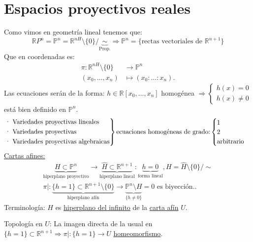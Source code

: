 \documentclass[10pt,a4paper,openright]{book}
\theoremstyle{break}
\begin{document}
\section{Espacios proyectivos reales}%
\label{sec:espacios_proyectivos_reales}
Como vimos en geometría lineal tenemos que: 
\[
\mathbb{R}P^n = \mathbb{P}^{n} = \mathbb{R}^{nH}\setminus \{0\} / \underbrace{\sim }_{\text{Prop.}} \Rightarrow \mathbb{P}^{n} = \{\text{rectas vectoriales de } \mathbb{R}^{n+1}\}     
\]
Que en coordenadas es:
\begin{align*}
    \pi: \mathbb{R}^{nH} \setminus \{0\} &\rightarrow \mathbb{P}^{n}\\
    \left( x_0, \ldots, x_n \right) &\mapsto \left( x_0 : \ldots : x_n \right) 
.\end{align*}
Las ecuaciones serán de la forma: $h\in \mathbb{R}\left[ x_0, \ldots, x_n \right]$ homogénea $\Rightarrow \begin{cases}
    h\left( x \right) = 0\\
    h\left( x \right) \neq 0
\end{cases}$ está bien definido en $\mathbb{P}^{n}$.
\[
\begin{rcases}
   \text{· Variedades proyectivas lineales}\\  
   \text{· Variedades proyectivas}\\
   \text{· Variedades proyectivas algebraicas}  
\end{rcases} \text{ecuaciones homogéneas de grado:} 
\begin{cases}
    1\\
    2\\
    \text{arbitrario} 
\end{cases} 
\]
\underline{Cartas afines:} 
\begin{gather*}
    \underbrace{H \subset \mathbb{P}^{n}}_{\text{hiperplano proyectivo}} \rightarrow \underbrace{\hat{H} \subset \mathbb{R}^{n + 1}}_{\text{hiperplano lineal} } : \underbrace{h = 0}_{\text{forma lineal}}, H = \hat{H} \setminus \{0\} / \sim  \\
    \pi|: \underbrace{\{h = 1\} \subset \mathbb{R}^{n + 1} \setminus \{0\}}_{\text{hiperplano afín}} \rightarrow \underbrace{\mathbb{P}^{n} \setminus H}_{\{h \neq 0\}} = 0 \text{ es biyección.}    
.\end{gather*}
Terminología: $H$ es \underline{hiperplano del infinito} de la \underline{carta afín} $U$.

Topología en $U$: La imagen directa de la usual en $\{h = 1\} \subset \mathbb{R}^{n + 1} \Rightarrow \pi|: \{h = 1\} \rightarrow U$ \underline{homeomorfismo}. 
\end{document}
